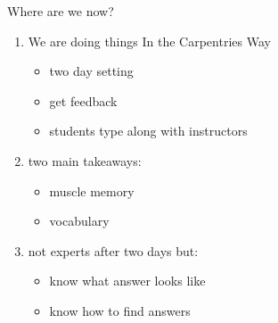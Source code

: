 \begin{frame} {Where are we now?}
	\begin{enumerate}
		\item We are doing things In the Carpentries Way
		\begin{itemize}
			\item two day setting
			\item get feedback
			\item students type along with instructors
		\end{itemize}
		\item two main takeaways:
			\begin{itemize}
				\item muscle memory 
				\item vocabulary
			\end{itemize}
		\item not experts after two days but:
			\begin{itemize}
				\item know what answer looks like
				\item know how to find answers
			\end{itemize} 
	\end{enumerate}
	

	\note[item]{}
\end{frame}